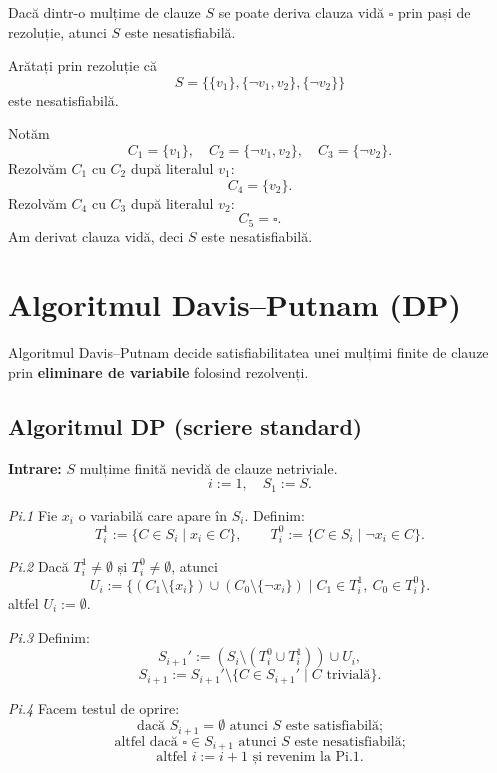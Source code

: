\begin{prop}
	Dacă dintr-o mulțime de clauze \(S\) se poate deriva clauza vidă \( \square \) prin pași de rezoluție, atunci \(S\) este nesatisfiabilă.
\end{prop}

\begin{ex}
	Arătați prin rezoluție că
	\[
		S = \{\{v_1\}, \{\neg v_1, v_2\}, \{\neg v_2\}\}
	\]
	este nesatisfiabilă.
\end{ex}

\begin{solutie}
	Notăm
	\[
		C_1=\{v_1\},\quad C_2=\{\neg v_1, v_2\},\quad C_3=\{\neg v_2\}.
	\]
	Rezolvăm \(C_1\) cu \(C_2\) după literalul \(v_1\):
	\[
		C_4 = \{v_2\}.
	\]
	Rezolvăm \(C_4\) cu \(C_3\) după literalul \(v_2\):
	\[
		C_5 = \square.
	\]
	Am derivat clauza vidă, deci \(S\) este nesatisfiabilă.
\end{solutie}

\section{Algoritmul Davis--Putnam (DP)}

Algoritmul Davis--Putnam decide satisfiabilitatea unei mulțimi finite de clauze prin \textbf{eliminare de variabile} folosind rezolvenți.

\subsection*{Algoritmul DP (scriere standard)}

\noindent \textbf{Intrare:} \(S\) mulțime finită nevidă de clauze netriviale.
\[
	i := 1, \quad S_1 := S.
\]

\noindent \textit{Pi.1} Fie \(x_i\) o variabilă care apare în \(S_i\). Definim:
\[
	T_i^1 := \{C \in S_i \mid x_i \in C\}, \qquad
	T_i^0 := \{C \in S_i \mid \neg x_i \in C\}.
\]

\noindent \textit{Pi.2} Dacă \(T_i^1 \neq \emptyset\) și \(T_i^0 \neq \emptyset\), atunci
\[
	U_i := \{(C_1 \setminus \{x_i\}) \cup (C_0 \setminus \{\neg x_i\}) \mid C_1 \in T_i^1,\ C_0 \in T_i^0\}.
\]
altfel \(U_i := \emptyset\).

\noindent \textit{Pi.3} Definim:
\[
	S_{i+1}' := (S_i \setminus (T_i^0 \cup T_i^1)) \cup U_i,
\]
\[
	S_{i+1} := S_{i+1}' \setminus \{C \in S_{i+1}' \mid C \text{ trivială}\}.
\]

\noindent \textit{Pi.4} Facem testul de oprire:
\[
	\text{dacă } S_{i+1} = \emptyset \text{ atunci } S \text{ este satisfiabilă;}
\]
\[
	\text{altfel dacă } \square \in S_{i+1} \text{ atunci } S \text{ este nesatisfiabilă;}
\]
\[
	\text{altfel } i := i+1 \text{ și revenim la Pi.1}.
\]

